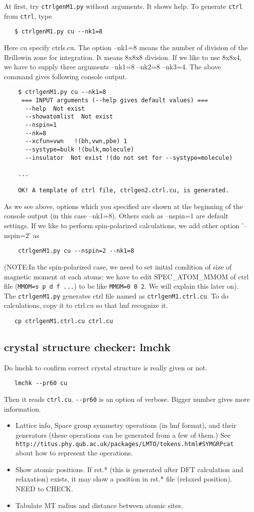 \documentclass[a4paper,10pt,epsf,fleqn]{article}
\begin{document}
At first, try \verb+ctrlgenM1.py+ without arguments. It shows help. 
To generate \verb+ctrl+ from \verb+ctrl+, type
\begin{verbatim}
   $ ctrlgenM1.py cu --nk1=8
\end{verbatim}
Here cu specify ctrls.cu. The option --nk1=8 
means the number of division of the Brillowin zone for
integration. It means 8x8x8 division. If we like to use 8x8x4, 
we have to supply three arguments --nk1=8 --nk2=8 --nk3=4.
The above command gives following console output.
\begin{verbatim}
    $ ctrlgenM1.py cu --nk1=8
     === INPUT arguments (--help gives default values) === 
      --help  Not exist
      --showatomlist  Not exist
      --nspin=1
      --nk=8
      --xcfun=vwn   !(bh,vwn,pbe) 1
      --systype=bulk !(bulk,molecule)
      --insulator  Not exist !(do not set for --systype=molecule)

    ...

    OK! A template of ctrl file, ctrlgen2.ctrl.cu, is generated.
\end{verbatim}
As we see above, 
options which you specified are shown at the beginning of the console output
(in this case --nk1=8). Others such as --nspin=1 are default settings.
If we like to perform spin-polarized calculations, we add other option
'--nspin=2' as
\begin{verbatim}
    ctrlgenM1.py cu --nspin=2 --nk1=8
\end{verbatim}
(NOTE:In the spin-polarized case, we need to set initial condition of size of
magnetic moment at each atoms: we have to edit
SPEC\_ATOM\_MMOM of ctrl file (\verb+MMOM=s p d f ...+) to be like
\verb+MMOM=0 0 2+. We will explain this later on).
The \verb+ctrlgenM1.py+ generates ctrl file named as
\verb+ctrlgenM1.ctrl.cu+. To do calculations, copy it to ctrl.cu so 
that lmf recognize it.
\begin{verbatim}
   cp ctrlgenM1.ctrl.cu ctrl.cu
\end{verbatim}

\subsection{crystal structure checker: lmchk}
Do lmchk to confirm correct crystal structure is really given or not.
\begin{verbatim}
   lmchk --pr60 cu 
\end{verbatim}
Then it reads \verb+ctrl.cu+. \verb+--pr60+ is an option of verbose. Bigger number gives more information.
\begin{itemize}
\item Lattice info, Space group symmetry operations (in lmf format), and
      their generators (these operations can be generated from a few of them.)
      See \verb+http://titus.phy.qub.ac.uk/packages/LMTO/tokens.html#SYMGRPcat+
      about how to represent the operations.
\item Show atomic positions. If rst.* (this is generated after DFT
      calculation and relaxation) exists, it may show a position in
      rst.* file (relaxed position). NEED to CHECK.
\item Tabulate MT radius and distance between atomic sites.
\end{itemize}
\end{document}
